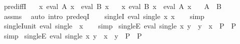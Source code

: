 \begin{isabellebody}
\ pred{\isacharunderscore}{\kern0pt}iffI{\isacharcolon}{\kern0pt}\isanewline
\ \ \ {\isachardoublequoteopen}{\isasymAnd}x{\isachardot}{\kern0pt}\ eval\ A\ x\ {\isasymLongrightarrow}\ eval\ B\ x{\isachardoublequoteclose}\isanewline
\ \ \ {\isachardoublequoteopen}{\isasymAnd}x{\isachardot}{\kern0pt}\ eval\ B\ x\ {\isasymLongrightarrow}\ eval\ A\ x{\isachardoublequoteclose}\isanewline
\ \ \ {\isachardoublequoteopen}A\ {\isacharequal}{\kern0pt}\ B{\isachardoublequoteclose}\isanewline
%
\isadelimproof
\ \ %
\endisadelimproof
%
\isatagproof
{}\isamarkupfalse%
\ assms\ \isamarkupfalse%
\ {\isacharparenleft}{\kern0pt}auto\ intro{\isacharcolon}{\kern0pt}\ pred{\isacharunderscore}{\kern0pt}eqI{\isacharparenright}{\kern0pt}%
\endisatagproof
{\isafoldproof}%
%
\isadelimproof
\isanewline
%
\endisadelimproof
\ \ \isanewline
{}\isamarkupfalse%
\ singleI{\isacharcolon}{\kern0pt}\ {\isachardoublequoteopen}eval\ {\isacharparenleft}{\kern0pt}single\ x{\isacharparenright}{\kern0pt}\ x{\isachardoublequoteclose}\isanewline
%
\isadelimproof
\ \ %
\endisadelimproof
%
\isatagproof
{}\isamarkupfalse%
\ simp%
\endisatagproof
{\isafoldproof}%
%
\isadelimproof
\isanewline
%
\endisadelimproof
\isanewline
{}\isamarkupfalse%
\ singleI{\isacharunderscore}{\kern0pt}unit{\isacharcolon}{\kern0pt}\ {\isachardoublequoteopen}eval\ {\isacharparenleft}{\kern0pt}single\ {\isacharparenleft}{\kern0pt}{\isacharparenright}{\kern0pt}{\isacharparenright}{\kern0pt}\ x{\isachardoublequoteclose}\isanewline
%
\isadelimproof
\ \ %
\endisadelimproof
%
\isatagproof
{}\isamarkupfalse%
\ simp%
\endisatagproof
{\isafoldproof}%
%
\isadelimproof
\isanewline
%
\endisadelimproof
\isanewline
{}\isamarkupfalse%
\ singleE{\isacharcolon}{\kern0pt}\ {\isachardoublequoteopen}eval\ {\isacharparenleft}{\kern0pt}single\ x{\isacharparenright}{\kern0pt}\ y\ {\isasymLongrightarrow}\ {\isacharparenleft}{\kern0pt}y\ {\isacharequal}{\kern0pt}\ x\ {\isasymLongrightarrow}\ P{\isacharparenright}{\kern0pt}\ {\isasymLongrightarrow}\ P{\isachardoublequoteclose}\isanewline
%
\isadelimproof
\ \ %
\endisadelimproof
%
\isatagproof
{}\isamarkupfalse%
\ simp%
\endisatagproof
{\isafoldproof}%
%
\isadelimproof
\isanewline
%
\endisadelimproof
\isanewline
{}\isamarkupfalse%
\ singleE{\isacharprime}{\kern0pt}{\isacharcolon}{\kern0pt}\ {\isachardoublequoteopen}eval\ {\isacharparenleft}{\kern0pt}single\ x{\isacharparenright}{\kern0pt}\ y\ {\isasymLongrightarrow}\ {\isacharparenleft}{\kern0pt}x\ {\isacharequal}{\kern0pt}\ y\ {\isasymLongrightarrow}\ P{\isacharparenright}{\kern0pt}\ {\isasymLongrightarrow}\ P{\isachardoublequoteclose}\isanewline

\end{isabellebody}
